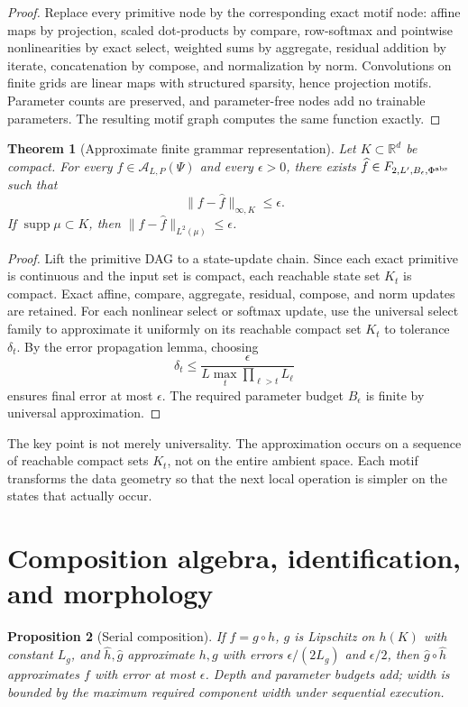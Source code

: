 \documentclass[11pt]{article}
\newtheorem{theorem}{Theorem}[section]
\newtheorem{proposition}[theorem]{Proposition}
\theoremstyle{definition}
\newcommand{\R}{\mathbb{R}}
\newcommand{\supp}{\operatorname{supp}}
\begin{document}
\begin{proof}
Replace every primitive node by the corresponding exact motif node: affine maps by projection, scaled dot-products by compare, row-softmax and pointwise nonlinearities by exact select, weighted sums by aggregate, residual addition by iterate, concatenation by compose, and normalization by norm. Convolutions on finite grids are linear maps with structured sparsity, hence projection motifs. Parameter counts are preserved, and parameter-free nodes add no trainable parameters. The resulting motif graph computes the same function exactly.
\end{proof}

\begin{theorem}[Approximate finite grammar representation]
Let \(K\subset\R^d\) be compact. For every \(f\in\mathcal A_{L,P}(\Psi)\) and every \(\epsilon>0\), there exists \(\widehat f\in F_{2,L',B_\epsilon,\Phi^{\rm abs}}\) such that
\[
  \|f-\widehat f\|_{\infty,K}\le \epsilon.
\]
If \(\supp\mu\subset K\), then \(\|f-\widehat f\|_{L^2(\mu)}\le \epsilon\).
\end{theorem}

\begin{proof}
Lift the primitive DAG to a state-update chain. Since each exact primitive is continuous and the input set is compact, each reachable state set \(K_t\) is compact. Exact affine, compare, aggregate, residual, compose, and norm updates are retained. For each nonlinear select or softmax update, use the universal select family to approximate it uniformly on its reachable compact set \(K_t\) to tolerance \(\delta_t\). By the error propagation lemma, choosing
\[
  \delta_t \le \frac{\epsilon}{L\max_t\prod_{\ell>t} L_\ell}
\]
ensures final error at most \(\epsilon\). The required parameter budget \(B_\epsilon\) is finite by universal approximation.
\end{proof}

The key point is not merely universality. The approximation occurs on a sequence of reachable compact sets \(K_t\), not on the entire ambient space. Each motif transforms the data geometry so that the next local operation is simpler on the states that actually occur.

\section{Composition algebra, identification, and morphology}

\begin{proposition}[Serial composition]
If \(f=g\circ h\), \(g\) is Lipschitz on \(h(K)\) with constant \(L_g\), and \(\widehat h,\widehat g\) approximate \(h,g\) with errors \(\epsilon/(2L_g)\) and \(\epsilon/2\), then \(\widehat g\circ\widehat h\) approximates \(f\) with error at most \(\epsilon\). Depth and parameter budgets add; width is bounded by the maximum required component width under sequential execution.
\end{proposition}
\end{document}
